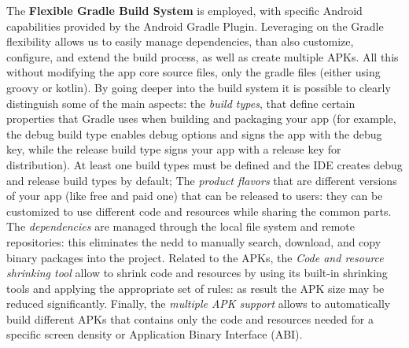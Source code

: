 \noindent The \textbf{Flexible Gradle Build System} is employed, with specific Android capabilities provided by the Android Gradle Plugin. Leveraging on the Gradle flexibility allows us to easily manage dependencies, than also customize, configure, and extend the build process, as well as create multiple APKs. All this without modifying the app core source files, only the gradle files (either using groovy or kotlin). By going deeper into the build system it is possible to clearly distinguish some of the main aspects: the \textit{build types}, that define certain properties that Gradle uses when building and packaging your app (for example, the debug build type enables debug options and signs the app with the debug key, while the release build type signs your app with a release key for distribution). At least one build types must be defined and the IDE creates debug and release build types by default; The \textit{product flavors} that are different versions of your app (like free and paid one) that can be released to users: they can be customized to use different code and resources while sharing the common parts. The \textit{dependencies} are managed through the local file system and remote repositories: this eliminates the nedd to manually search, download, and copy binary packages into the project. Related to the APKs, the \textit{Code and resource shrinking tool} allow to  shrink code and resources by using its built-in shrinking tools and applying the appropriate set of rules: as result the APK size may be reduced significantly. Finally, the \textit{multiple APK support} allows to automatically build different APKs that contains only the code and resources needed for a specific screen density or Application Binary Interface (ABI)\cite{AndroidStudioBuildSystemFeature}.

